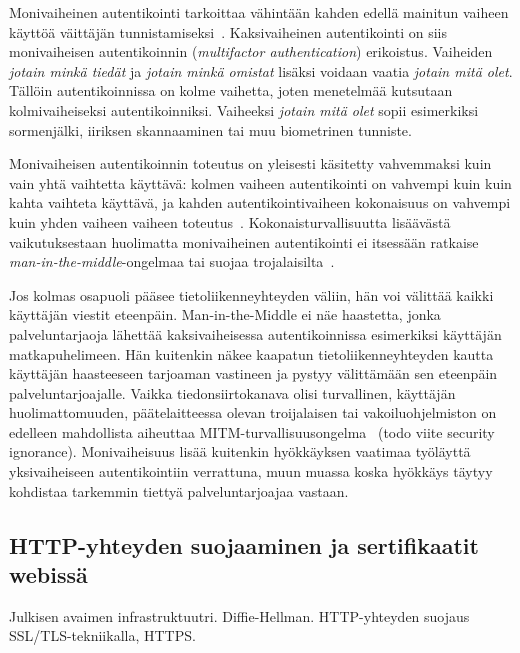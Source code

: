 \documentclass[finnish,gradu]{tktltiki}
\begin{document}
  Monivaiheinen autentikointi tarkoittaa vähintään kahden edellä mainitun vaiheen käyttöä väittäjän tunnistamiseksi~\cite{NIST_SP800-63-1}. Kaksivaiheinen autentikointi on siis monivaiheisen autentikoinnin (\emph{multifactor authentication}) erikoistus. Vaiheiden \emph{jotain minkä tiedät} ja \emph{jotain minkä omistat} lisäksi voidaan vaatia \emph{jotain mitä olet}. Tällöin autentikoinnissa on kolme vaihetta, joten menetelmää kutsutaan kolmivaiheiseksi autentikoinniksi. Vaiheeksi \emph{jotain mitä olet} sopii esimerkiksi sormenjälki, iiriksen skannaaminen tai muu biometrinen tunniste.

  Monivaiheisen autentikoinnin toteutus on yleisesti käsitetty vahvemmaksi kuin vain yhtä vaihtetta käyttävä: kolmen vaiheen autentikointi on vahvempi kuin kuin kahta vaihteta käyttävä, ja kahden autentikointivaiheen kokonaisuus on vahvempi kuin yhden vaiheen vaiheen toteutus~\cite{NIST_SP800-63-1}. Kokonaisturvallisuutta lisäävästä vaikutuksestaan huolimatta monivaiheinen autentikointi ei itsessään ratkaise \emph{man-in-the-middle}-ongelmaa tai suojaa trojalaisilta~\cite{schneier_2factor_2005}.

  Jos kolmas osapuoli pääsee tietoliikenneyhteyden väliin, hän voi välittää kaikki käyttäjän viestit eteenpäin. Man-in-the-Middle ei näe haastetta, jonka palveluntarjaoja lähettää kaksivaiheisessa autentikoinnissa esimerkiksi käyttäjän matkapuhelimeen. Hän kuitenkin näkee kaapatun tietoliikenneyhteyden kautta käyttäjän haasteeseen tarjoaman vastineen ja pystyy välittämään sen eteenpäin palveluntarjoajalle. Vaikka tiedonsiirtokanava olisi turvallinen, käyttäjän huolimattomuuden, päätelaitteessa olevan troijalaisen tai vakoiluohjelmiston on edelleen mahdollista aiheuttaa MITM-turvallisuusongelma~\cite{schneier_2factor_2012} (todo viite security ignorance). Monivaiheisuus lisää kuitenkin hyökkäyksen vaatimaa työläyttä yksivaiheiseen autentikointiin verrattuna, muun muassa koska hyökkäys täytyy kohdistaa tarkemmin tiettyä palveluntarjoajaa vastaan.




  \subsection{HTTP-yhteyden suojaaminen ja sertifikaatit webissä} %
  \label{sub:sertifikaatit_webissä}
  Julkisen avaimen infrastruktuutri.
  Diffie-Hellman.
  HTTP-yhteyden suojaus SSL/TLS-tekniikalla, HTTPS.
\end{document}
